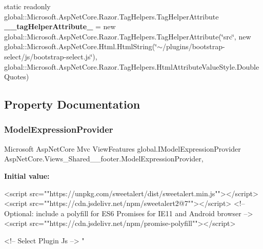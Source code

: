 \begin{DoxyCompactItemize}
\item 
\mbox{\label{class_asp_net_core_1_1_views___shared____footer_a1ea3b7557bc4bb7be89e0fd017cee02d}} 
static readonly global\+::\+Microsoft.\+Asp\+Net\+Core.\+Razor.\+Tag\+Helpers.\+Tag\+Helper\+Attribute {\bfseries \+\_\+\+\_\+tag\+Helper\+Attribute\+\_} = new global\+::\+Microsoft.\+Asp\+Net\+Core.\+Razor.\+Tag\+Helpers.\+Tag\+Helper\+Attribute(\char`\"{}src\char`\"{}, new global\+::\+Microsoft.\+Asp\+Net\+Core.\+Html.\+Html\+String(\char`\"{}$\sim$/plugins/bootstrap-\/select/js/bootstrap-\/select.\+js\char`\"{}), global\+::\+Microsoft.\+Asp\+Net\+Core.\+Razor.\+Tag\+Helpers.\+Html\+Attribute\+Value\+Style.\+Double\+Quotes)
\end{DoxyCompactItemize}


\subsection{Property Documentation}
\mbox{\label{class_asp_net_core_1_1_views___shared____footer_acf693387fe9ff38332e6c467c8f05e1d}} 
\subsubsection{\texorpdfstring{Model\+Expression\+Provider}{ModelExpressionProvider}}
{\footnotesize\ttfamily Microsoft Asp\+Net\+Core Mvc View\+Features global.\+I\+Model\+Expression\+Provider Asp\+Net\+Core.\+Views\+\_\+\+Shared\+\_\+\+\_\+footer.\+Model\+Expression\+Provider\hspace{0.3cm}{\ttfamily [get]}, {}}

{\bfseries Initial value\+:}
\begin{DoxyCode}


<script src=\textcolor{stringliteral}{""}https:\textcolor{comment}{//unpkg.com/sweetalert/dist/sweetalert.min.js""></script>}
<script src=\textcolor{stringliteral}{""}https:\textcolor{comment}{//cdn.jsdelivr.net/npm/sweetalert2@7""></script>}
<!-- Optional: include a polyfill \textcolor{keywordflow}{for} ES6 Promises \textcolor{keywordflow}{for} IE11 and Android browser -->
<script src=\textcolor{stringliteral}{""}https:\textcolor{comment}{//cdn.jsdelivr.net/npm/promise-polyfill""></script>}


<!-- Select Plugin Js -->
\textcolor{stringliteral}{"}
\end{DoxyCode}


